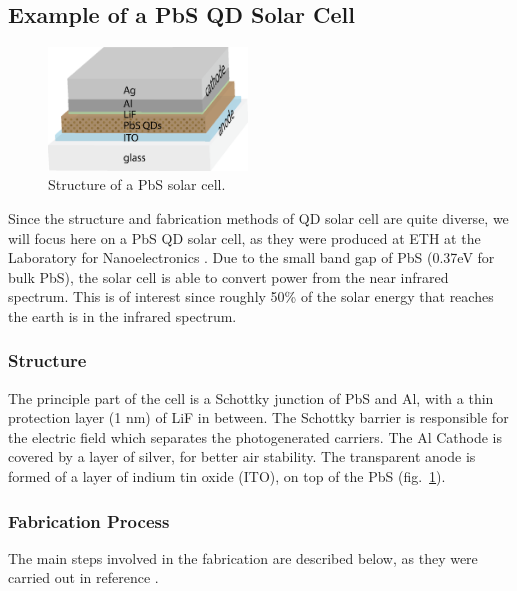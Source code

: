 \subsection{Example of a PbS QD Solar Cell}


\begin{figure}
	\centering
	\includegraphics[width=200px]{Fig/SolarCell/PbSsolarCellStructure}
	\caption{Structure of a PbS solar cell.}
	\label{fig:PbSsolarCellStructure}
\end{figure}


Since the structure and fabrication methods of QD solar cell are quite diverse, we will focus here on a PbS QD solar cell, as they were produced at ETH at the Laboratory for Nanoelectronics \cite{MS_Michael}. Due to the small band gap of PbS (0.37eV for bulk PbS), the solar cell is able to convert power from the near infrared spectrum. This is of interest since roughly 50\% of the solar energy that reaches the earth is in the infrared spectrum.

\subsubsection{Structure}

The principle part of the cell is a Schottky junction of PbS and Al, with a thin protection layer (1 nm) of LiF in between. The Schottky barrier is responsible for the electric field which separates the photogenerated carriers. The Al Cathode is covered by a layer of silver, for better air stability. The transparent anode is formed of a layer of indium tin oxide (ITO), on top of the PbS (fig.~\ref{fig:PbSsolarCellStructure}).

\subsubsection{Fabrication Process}

The main steps involved in the fabrication are described below, as they were carried out in reference \cite[pp. 13-19]{MS_Michael}.

